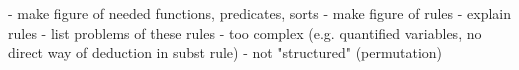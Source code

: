 - make figure of needed functions, predicates, sorts
- make figure of rules
- explain rules
- list problems of these rules
  - too complex (e.g. quantified variables, no direct way of deduction in subst rule)
  - not "structured" (permutation)
% 
%
